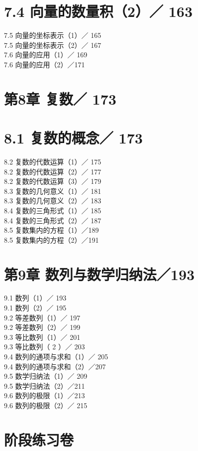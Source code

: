 \documentclass[10pt]{article}
\begin{document}
\section*{7.4 向量的数量积（2）／ 163}
7.5 向量的坐标表示（1）／ 165\\
7.5 向量的坐标表示（2）／ 167\\
7.6 向量的应用（1）／ 169\\
7.6 向量的应用（2）／171

\section*{第8章 复数／ 173}
\section*{8.1 复数的概念／ 173}
8.2 复数的代数运算（1）／ 175\\
8.2 复数的代数运算（2）／ 177\\
8.2 复数的代数运算（3）／ 179\\
8.3 复数的几何意义（1）／ 181\\
8.3 复数的几何意义（2）／ 183\\
8.4 复数的三角形式（1）／ 185\\
8.4 复数的三角形式（2）／ 187\\
8.5 复数集内的方程（1）／189\\
8.5 复数集内的方程（2）／191

\section*{第9章 数列与数学归纳法／193}
9.1 数列（1）／ 193\\
9.1 数列（2）／ 195\\
9.2 等差数列（1）／ 197\\
9.2 等差数列（2）／ 199\\
9.3 等比数列（1）／ 201\\
9.3 等比数列（ 2 ）／ 203\\
9.4 数列的通项与求和（1）／ 205\\
9.4 数列的通项与求和（2）／207\\
9.5 数学归纳法（1）／ 209\\
9.5 数学归纳法（2）／211\\
9.6 数列的极限（1）／213\\
9.6 数列的极限（2）／ 215

\section*{阶段练习卷}
\end{document}
